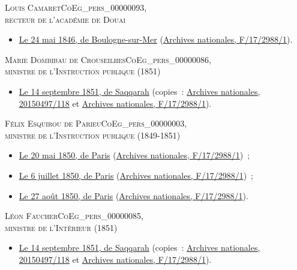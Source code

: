 \documentclass{book}
\begin{document}
{\begin{center} \textsc{Louis Camaret\gls{CoEg_pers_00000093},\\
recteur de l’académie de Douai}\end{center}
\begin{itemize}
\item \hyperlink{CoEg_Mariette_1846-05-24}{Le 24 mai 1846, de Boulogne-sur-Mer} (\hyperlink{CoEg_Mariette_ms_002}{Archives nationales, F/17/2988/1}).
\end{itemize}

\begin{center} \textsc{Marie Dombibau de Crouseilhes\gls{CoEg_pers_00000086},\\
ministre de l'Instruction publique (1851)}\end{center}
\begin{itemize}
\item \hyperlink{CoEg_Mariette_1851-10-14b}{Le 14 septembre 1851, de Saqqarah} (copies~: \hyperlink{CoEg_Mariette_ms_001}{Archives nationales, 20150497/118} et \hyperlink{CoEg_Mariette_ms_002}{Archives nationales, F/17/2988/1}).
\end{itemize}

\begin{center} \textsc{Félix Esquirou de Parieu\gls{CoEg_pers_00000003},\\
ministre de l'Instruction publique (1849-1851)}\end{center}
\begin{itemize}
\item \hyperlink{CoEg_Mariette_1850-05-20}{Le 20 mai 1850, de Paris} (\hyperlink{CoEg_Mariette_ms_002}{Archives nationales, F/17/2988/1})~;
\item \hyperlink{CoEg_Mariette_1850-07-06}{Le 6 juillet 1850, de Paris} (\hyperlink{CoEg_Mariette_ms_002}{Archives nationales, F/17/2988/1})~;
\item \hyperlink{CoEg_Mariette_1850-08-27}{Le 27 août 1850, de Paris} (\hyperlink{CoEg_Mariette_ms_002}{Archives nationales, F/17/2988/1}).
\end{itemize}

\begin{center} \textsc{Léon Faucher\gls{CoEg_pers_00000085},\\
ministre de l'Intérieur (1851)}\end{center}
\begin{itemize}
\item \hyperlink{CoEg_Mariette_1851-10-14b}{Le 14 septembre 1851, de Saqqarah} (copies~: \hyperlink{CoEg_Mariette_ms_001}{Archives nationales, 20150497/118} et \hyperlink{CoEg_Mariette_ms_002}{Archives nationales, F/17/2988/1}).
\end{itemize}

}
\end{document}
